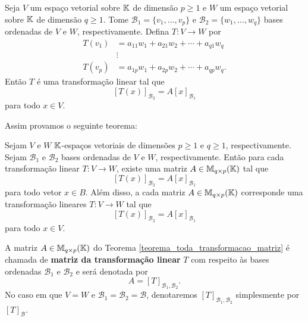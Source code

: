 Seja $V$ um espa\c{c}o vetorial sobre $\mathbb{K}$ de dimens\~ao $p \ge 1$ e $W$ um espa\c{c}o vetorial sobre $\mathbb{K}$ de dimens\~ao $q \ge 1$. Tome $\mathcal{B}_1 = \{v_1,\dots,v_p\}$ e $\mathcal{B}_2 = \{w_1,\dots,w_q\}$ bases ordenadas de $V$ e $W$, respectivamente. Defina $T : V \to W$ por
\begin{align*}
	T(v_1) &= a_{11}w_1 + a_{21}w_2 + \cdots + a_{q1}w_q\\
	&\vdots\\
	T(v_p) &= a_{1p}w_1 + a_{2p}w_2 + \cdots + a_{qp}w_q.
\end{align*}
Ent\~ao $T$ \'e uma transforma\c{c}\~ao linear  tal que
\[
	[T(x)]_{\mathcal{B}_2} = A[x]_{\mathcal{B}_1}
\]
para todo $x \in V$.

Assim provamos o seguinte teorema:
\begin{teorema}\label{teorema_toda_transformacao_matriz}
	Sejam $V$ e $W$ $\mathbb{K}$-espa\c{c}os vetoriais de dimens\~oes $p \ge 1$ e $q \ge 1$, respectivamente. Sejam $\mathcal{B}_1$ e $\mathcal{B}_2$ bases ordenadas de $V$ e $W$, respectivamente. Ent\~ao para cada transforma\c{c}\~ao linear $T : V \to W$, existe uma matriz $A \in \mathbb{M}_{q\times p}(\mathbb{K})$ tal que
	\[
		[T(x)]_{\mathcal{B}_2} = A[x]_{\mathcal{B}_1}
	\]
	para todo vetor $x \in B$. Al\'em disso, a cada matriz $A \in \mathbb{M}_{q\times p}(\mathbb{K})$ corresponde uma transforma\c{c}\~ao lineares $T : V \to W$ tal que
	\[
		[T(x)]_{\mathcal{B}_2} = A[x]_{\mathcal{B}_1}
	\]
	para todo $x \in V$.
\end{teorema}

\begin{definicao}
	A matriz $A \in \mathbb{M}_{q\times p}(\mathbb{K})$ do Teorema \ref{teorema_toda_transformacao_matriz} \'e chamada de \textbf{matriz da transforma\c{c}\~ao linear} $T$ com respeito \`as bases ordenadas $\mathcal{B}_1$ e $\mathcal{B}_2$ e ser\'a denotada por
	\[
		A = [T]_{\mathcal{B}_{1},\mathcal{B}_{2}}.
	\]
	No caso em que $V = W$ e $\mathcal{B}_1 = \mathcal{B}_2 = \mathcal{B}$, denotaremos $[T]_{\mathcal{B}_{1},\mathcal{B}_{2}}$ simplesmente por $[T]_\mathcal{B}$.
\end{definicao}

